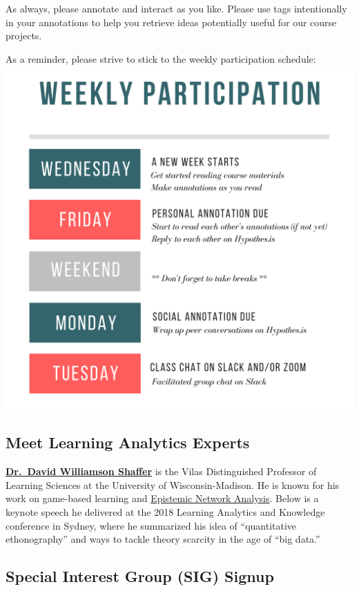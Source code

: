 \documentclass[
]{book}
\begin{document}
As always, please annotate and interact as you like. Please use tags intentionally in your annotations to help you retrieve ideas potentially useful for our course projects.

As a reminder, please strive to stick to the weekly participation schedule:
\includegraphics{img/weekly-schedule.png}

\hypertarget{meet-learning-analytics-experts}{%
\subsection{Meet Learning Analytics Experts}\label{meet-learning-analytics-experts}}

\textbf{\href{https://edpsych.education.wisc.edu/staff/williamson-shaffer-david/}{Dr.~David Williamson Shaffer}} is the Vilas Distinguished Professor of Learning Sciences at the University of Wisconsin-Madison. He is known for his work on game-based learning and \href{http://www.epistemicanalytics.org/}{Epistemic Network Analysis}. Below is a keynote speech he delivered at the 2018 Learning Analytics and Knowledge conference in Sydney, where he summarized his idea of ``quantitative ethonography'' and ways to tackle theory scarcity in the age of ``big data.''

\hypertarget{special-interest-group-sig-signup}{%
\subsection{Special Interest Group (SIG) Signup}\label{special-interest-group-sig-signup}}
\end{document}
